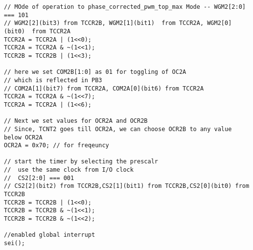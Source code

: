 \begin{verbatim}
// MOde of operation to phase_corrected_pwm_top_max Mode -- WGM2[2:0] === 101
// WGM2[2](bit3) from TCCR2B, WGM2[1](bit1)  from TCCR2A, WGM2[0](bit0)  from TCCR2A
TCCR2A = TCCR2A | (1<<0);
TCCR2A = TCCR2A & ~(1<<1);
TCCR2B = TCCR2B | (1<<3);	

// here we set COM2B[1:0] as 01 for toggling of OC2A
// which is reflected in PB3
// COM2A[1](bit7) from TCCR2A, COM2A[0](bit6) from TCCR2A
TCCR2A = TCCR2A & ~(1<<7);
TCCR2A = TCCR2A | (1<<6);

// Next we set values for OCR2A and OCR2B
// Since, TCNT2 goes till OCR2A, we can choose OCR2B to any value below OCR2A
OCR2A = 0x70; // for freqeuncy

// start the timer by selecting the prescalr
//  use the same clock from I/O clock
//  CS2[2:0] === 001
// CS2[2](bit2) from TCCR2B,CS2[1](bit1) from TCCR2B,CS2[0](bit0) from TCCR2B
TCCR2B = TCCR2B | (1<<0);
TCCR2B = TCCR2B & ~(1<<1);
TCCR2B = TCCR2B & ~(1<<2);

//enabled global interrupt
sei();
\end{verbatim}

